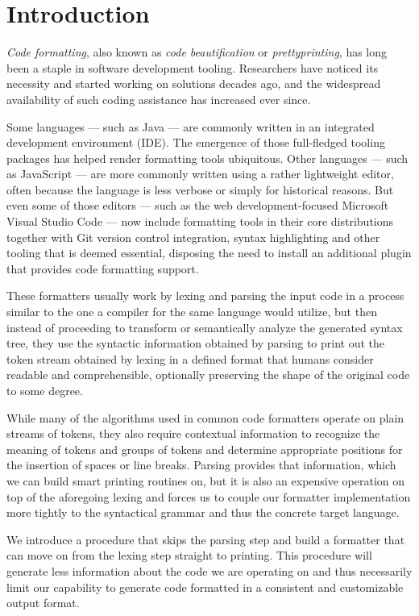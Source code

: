 \chapter{Introduction}
\textit{Code formatting}, also known as \textit{code beautification} or \textit{prettyprinting},
has long been a staple in software development tooling.
Researchers have noticed its necessity and started working on solutions decades ago,
\autocite{syntaxDirectedPrettyprinting}
and the widespread availability of such coding assistance has increased ever since.

Some languages --- such as Java --- are commonly written in an integrated development environment (IDE).
The emergence of those full-fledged tooling packages has helped render formatting tools ubiquitous.
Other languages --- such as JavaScript --- are more commonly written using a rather lightweight editor,
often because the language is less verbose or simply for historical reasons.
But even some of those editors --- such as the web development-focused Microsoft Visual Studio Code ---
now include formatting tools in their core distributions together with
Git version control integration, syntax highlighting and other tooling that is deemed essential,
disposing the need to install an additional plugin that provides code formatting support.
\autocite{vsCodeJavascriptDoc}

These formatters usually work by lexing and parsing the input code
in a process similar to the one a compiler for the same language would utilize,
but then instead of proceeding to transform or semantically analyze the generated syntax tree,
they use the syntactic information obtained by parsing
to print out the token stream obtained by lexing
in a defined format that humans consider readable and comprehensible,
optionally preserving the shape of the original code to some degree.
\autocite{prettyGoodFormattingPipeline}

While many of the algorithms used in common code formatters
operate on plain streams of tokens, \autocite{prettyprinting}
they also require contextual information
to recognize the meaning of tokens and groups of tokens
and determine appropriate positions for the insertion of spaces or line breaks.
Parsing provides that information, which we can build smart printing routines on,
but it is also an expensive operation on top of the aforegoing lexing
and forces us to couple our formatter implementation more tightly
to the syntactical grammar and thus the concrete target language.

We introduce a procedure that skips the parsing step and
build a formatter that can move on from the lexing step straight to printing.
This procedure will generate less information about the code we are operating on and
thus necessarily limit our capability to generate code
formatted in a consistent and customizable output format.

